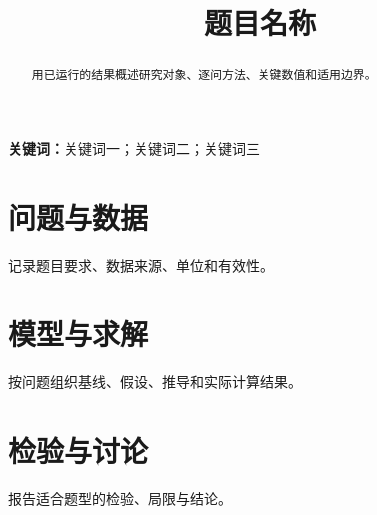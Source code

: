 \documentclass[UTF8,a4paper,12pt]{ctexart}
\title{题目名称}
\author{}
\date{}
\begin{document}
\maketitle
\begin{abstract}
用已运行的结果概述研究对象、逐问方法、关键数值和适用边界。
\end{abstract}
\noindent\textbf{关键词：}关键词一；关键词二；关键词三
\section{问题与数据}
记录题目要求、数据来源、单位和有效性。
\section{模型与求解}
按问题组织基线、假设、推导和实际计算结果。
\section{检验与讨论}
报告适合题型的检验、局限与结论。
\end{document}
